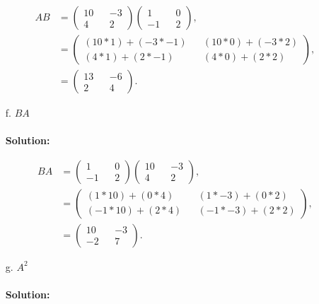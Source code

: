 \documentclass[12pt]{article}
\makeatletter
\theoremstyle{homework}
\newenvironment{exercise}[1]
{\def\@currentlabel{#1}\exercisecore}
{\endexercisecore}
\makeatother
\begin{document}
\begin{exercise}{2}
\begin{enumerate}
  \begin{align*}
    AB &=
    \begin{pmatrix}
      10 && -3 \\
      4 && 2 
    \end{pmatrix}
    \begin{pmatrix}
      1 && 0 \\
      -1 && 2 
    \end{pmatrix},
    \\
    &=
    \begin{pmatrix}
      (10*1) + (-3*-1) && (10*0) + (-3*2) \\
      (4*1) + (2*-1) && (4*0) + (2*2)
    \end{pmatrix},
    \\
    &= \begin{pmatrix}
      13 && -6 \\
      2 && 4 
    \end{pmatrix}.
  \end{align*}

  \item[f.] $BA$\\\\
  \textbf{Solution:}

  \begin{align*}
    BA &=
    \begin{pmatrix}
      1 && 0 \\
      -1 && 2 
    \end{pmatrix}
    \begin{pmatrix}
      10 && -3 \\
      4 && 2 
    \end{pmatrix},
    \\
    &=
    \begin{pmatrix}
      (1*10) + (0*4) && (1*-3) + (0*2) \\
      (-1*10) + (2*4) && (-1*-3) + (2*2)
    \end{pmatrix},
    \\
    &= \begin{pmatrix}
      10 && -3 \\
      -2 && 7 
    \end{pmatrix}.
  \end{align*}


  \item[g.] $A^2$\\\\
  \textbf{Solution:}
  

\end{enumerate}
\end{exercise}
\end{document}
